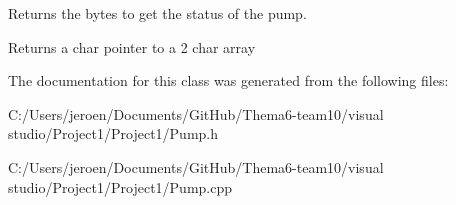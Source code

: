 Returns the bytes to get the status of the pump. 

\begin{DoxyReturn}{Returns}
a char pointer to a 2 char array 
\end{DoxyReturn}


The documentation for this class was generated from the following files\+:\begin{DoxyCompactItemize}
\item 
C\+:/\+Users/jeroen/\+Documents/\+Git\+Hub/\+Thema6-\/team10/visual studio/\+Project1/\+Project1/Pump.\+h\item 
C\+:/\+Users/jeroen/\+Documents/\+Git\+Hub/\+Thema6-\/team10/visual studio/\+Project1/\+Project1/Pump.\+cpp\end{DoxyCompactItemize}
